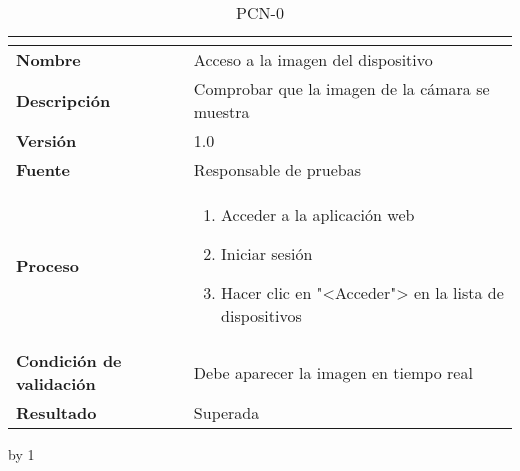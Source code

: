 \begin{table}[H]
	\caption{PCN-0\number\pcn}
	\begin{tabular}{|l|p{}|}
		\hline
		\multicolumn{2}{|c|}{\cellcolor[HTML]{BFBFBF}{\color[HTML]{000000} \textbf{PCN-0\number\pcn}}} \\ \hline
		\textbf{Nombre}                  & Acceso a la imagen del dispositivo              \\ \hline
		\textbf{Descripción}             & Comprobar que la imagen de la cámara se muestra \\ \hline
		\textbf{Versión}                 & 1.0                                             \\ \hline
		\textbf{Fuente}                  & Responsable de pruebas                          \\ \hline
		\textbf{Proceso}                 & \begin{enumerate}
			\item Acceder a la aplicación web
			\item Iniciar sesión
			\item Hacer clic en "<Acceder"> en la lista de dispositivos
		\end{enumerate}                      \\ \hline
		\textbf{Condición de validación} & Debe aparecer la imagen en tiempo real          \\ \hline
		\textbf{Resultado}               & Superada                                        \\ \hline
	\end{tabular}
\end{table}
\advance\pcn by 1
